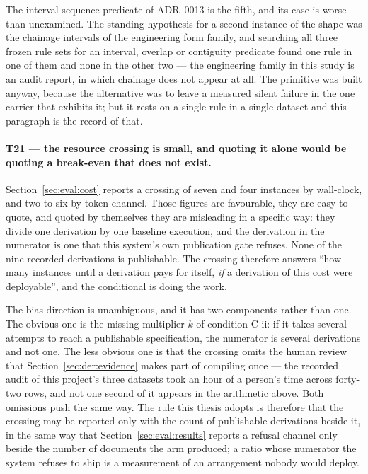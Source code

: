 The interval-sequence predicate of ADR~0013 is the fifth, and its case is worse than
unexamined. The standing hypothesis for a second instance of the shape was the chainage
intervals of the engineering form family, and searching all three frozen rule sets for an
interval, overlap or contiguity predicate found one rule in one of them and none in the other
two --- the engineering family in this study is an audit report, in which chainage does not
appear at all. The primitive was built anyway, because the alternative was to leave a measured
silent failure in the one carrier that exhibits it; but it rests on a single rule in a single
dataset and this paragraph is the record of that.

\paragraph{T21 --- the resource crossing is small, and quoting it alone would be quoting a
break-even that does not exist.}
Section~\ref{sec:eval:cost} reports a crossing of seven and four instances by wall-clock, and
two to six by token channel. Those figures are favourable, they are easy to quote, and quoted
by themselves they are misleading in a specific way: they divide one derivation by one baseline
execution, and the derivation in the numerator is one that this system's own publication gate
refuses. None of the nine recorded derivations is publishable. The crossing therefore answers
``how many instances until a derivation pays for itself, \emph{if} a derivation of this cost
were deployable'', and the conditional is doing the work.

The bias direction is unambiguous, and it has two components rather than one. The obvious one
is the missing multiplier $k$ of condition C-ii: if it takes several attempts to reach a
publishable specification, the numerator is several derivations and not one. The less obvious
one is that the crossing omits the human review that Section~\ref{sec:der:evidence} makes part
of compiling once --- the recorded audit of this project's three datasets took an hour of a
person's time across forty-two rows, and not one second of it appears in the arithmetic above.
Both omissions push the same way. The rule this thesis adopts is therefore that the crossing
may be reported only with the count of publishable derivations beside it, in the same way that
Section~\ref{sec:eval:results} reports a refusal channel only beside the number of documents
the arm produced; a ratio whose numerator the system refuses to ship is a measurement of an
arrangement nobody would deploy.

